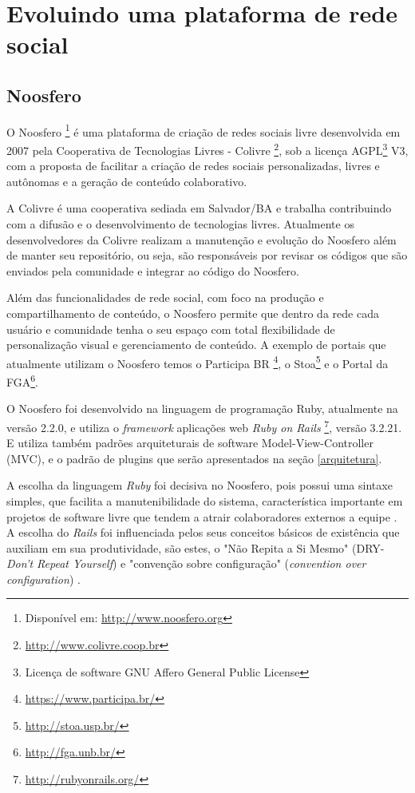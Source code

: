 \chapter{Evoluindo uma plataforma de rede social}
\label{evol-rede-social}
%
\section{Noosfero}
\label{evol-rede-social}

O Noosfero \footnote{Disponível em: \url{http://www.noosfero.org}} é uma plataforma de criação de redes sociais livre desenvolvida em 2007 pela Cooperativa de Tecnologias Livres - Colivre \footnote{\url{http://www.colivre.coop.br}}, sob a licença AGPL\footnote{Licença de software GNU Affero General Public License} V3, com a proposta de facilitar a criação de redes sociais personalizadas, livres e autônomas e a geração de conteúdo colaborativo.

A Colivre é uma cooperativa sediada em Salvador/BA e trabalha contribuindo  com a difusão e o desenvolvimento de tecnologias livres. Atualmente os desenvolvedores da Colivre realizam a manutenção e evolução do Noosfero além de manter seu repositório, ou seja, são responsáveis por revisar os códigos que são enviados pela comunidade e integrar ao código do Noosfero.

Além das funcionalidades de rede social, com foco na produção e compartilhamento de
conteúdo, o Noosfero permite que dentro da rede cada usuário e comunidade tenha o seu espaço com total flexibilidade de personalização visual e gerenciamento de conteúdo. A exemplo de portais que atualmente utilizam o Noosfero temos o Participa BR \footnote{\url{https://www.participa.br/}}, o Stoa\footnote{\url{http://stoa.usp.br/}} e o Portal da FGA\footnote{\url{http://fga.unb.br/}}.

O Noosfero foi desenvolvido na linguagem de programação Ruby, atualmente na versão 2.2.0, e utiliza o \textit{framework} aplicações web \textit{Ruby on Rails} \footnote{\url{http://rubyonrails.org/}}, versão 3.2.21. E utiliza também padrões arquiteturais de software Model-View-Controller (MVC), e o padrão de plugins que serão apresentados na seção \ref{arquitetura}.

A escolha da linguagem \textit{Ruby} foi decisiva no Noosfero, pois possui uma sintaxe simples, que facilita a manutenibilidade do sistema, característica importante em projetos de software livre que tendem a atrair colaboradores externos a equipe \cite{meirelles2013}. A escolha do \textit{Rails} foi influenciada pelos seus conceitos básicos de existência que auxiliam em sua produtividade, são estes, o "Não Repita a Si Mesmo" (DRY-\textit{Don't Repeat Yourself}) e "convenção sobre configuração" (\textit{convention over configuration}) \cite{akita2006repensando}.


